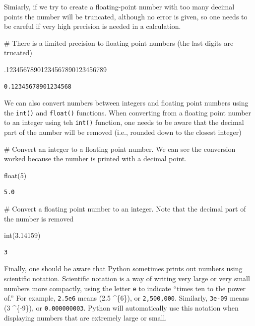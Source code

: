 \documentclass[
  letterpaper,
  DIV=11,
  numbers=noendperiod]{scrreprt}
\newenvironment{Shaded}{\begin{snugshade}}{\end{snugshade}}
\newcommand{\BuiltInTok}[1]{\textcolor[rgb]{0.00,0.23,0.31}{#1}}
\newcommand{\CommentTok}[1]{\textcolor[rgb]{0.37,0.37,0.37}{#1}}
\newcommand{\DecValTok}[1]{\textcolor[rgb]{0.68,0.00,0.00}{#1}}
\newcommand{\FloatTok}[1]{\textcolor[rgb]{0.68,0.00,0.00}{#1}}
\newcommand{\NormalTok}[1]{\textcolor[rgb]{0.00,0.23,0.31}{#1}}
\begin{document}
Simiarly, if we try to create a floating-point number with too many
decimal points the number will be truncated, although no error is given,
so one needs to be careful if very high precision is needed in a
calculation.

\begin{Shaded}
\begin{Highlighting}[]
\CommentTok{\# There is a limited precision to floating point numbers (the last digits are trucated)}

\FloatTok{.12345678901234567890123456789} 
\end{Highlighting}
\end{Shaded}

\begin{verbatim}
0.12345678901234568
\end{verbatim}

We can also convert numbers between integers and floating point numbers
using the \texttt{int()} and \texttt{float()} functions. When converting
from a floating point number to an integer using teh \texttt{int()}
function, one needs to be aware that the decimal part of the number will
be removed (i.e., rounded down to the closest integer)

\begin{Shaded}
\begin{Highlighting}[]
\CommentTok{\# Convert an integer to a floating point number.  We can see the conversion worked because the number is printed with a decimal point. }

\BuiltInTok{float}\NormalTok{(}\DecValTok{5}\NormalTok{)}
\end{Highlighting}
\end{Shaded}

\begin{verbatim}
5.0
\end{verbatim}

\begin{Shaded}
\begin{Highlighting}[]
\CommentTok{\# Convert a floating point number to an integer. Note that the decimal part of the number is removed}

\BuiltInTok{int}\NormalTok{(}\FloatTok{3.14159}\NormalTok{)}
\end{Highlighting}
\end{Shaded}

\begin{verbatim}
3
\end{verbatim}

Finally, one should be aware that Python sometimes prints out numbers
using scientific notation. Scientific notation is a way of writing very
large or very small numbers more compactly, using the letter \texttt{e}
to indicate ``times ten to the power of.'' For example, \texttt{2.5e6}
means (2.5 \^{}\{6\}), or \texttt{2,500,000}. Similarly,
\texttt{3e-09} means (3 \^{}\{-9\}), or \texttt{0.000000003}.
Python will automatically use this notation when displaying numbers that
are extremely large or small.
\end{document}
